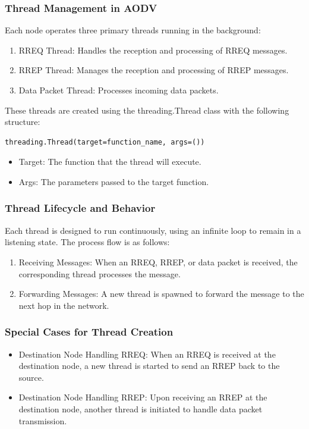 \documentclass[]{nsm-thesis}
\begin{document}
\subsubsection{Thread Management in AODV}
Each node operates three primary threads running in the background:
\begin{enumerate}
    \item RREQ Thread: Handles the reception and processing of RREQ messages.
    \item RREP Thread: Manages the reception and processing of RREP messages.
    \item Data Packet Thread: Processes incoming data packets.
\end{enumerate}

These threads are created using the threading.Thread class with the following structure:
 \begin{lstlisting}[caption={Thread Creation in Python}, label={lst:example}]
threading.Thread(target=function_name, args=())
\end{lstlisting}
\begin{itemize}
    \item Target: The function that the thread will execute.
    \item Args: The parameters passed to the target function.
\end{itemize}
\subsubsection{Thread Lifecycle and Behavior}
Each thread is designed to run continuously, using an infinite loop to remain in a listening state. The process flow is as follows:
\begin{enumerate}
    \item Receiving Messages: When an RREQ, RREP, or data packet is received, the corresponding thread processes the message.
    \item Forwarding Messages: A new thread is spawned to forward the message to the next hop in the network.
\end{enumerate}
\subsubsection{Special Cases for Thread Creation}
\begin{itemize}
    \item Destination Node Handling RREQ: When an RREQ is received at the destination node, a new thread is started to send an RREP back to the source.
    \item Destination Node Handling RREP: Upon receiving an RREP at the destination node, another thread is initiated to handle data packet transmission.
\end{itemize}
\end{document}
